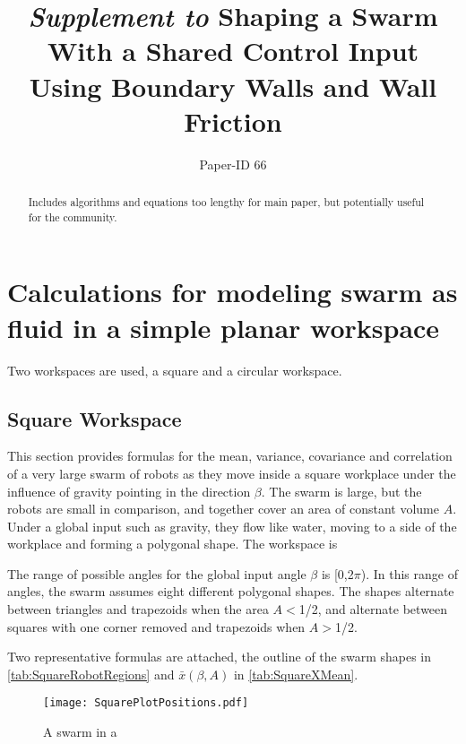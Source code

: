 \documentclass[conference]{IEEEtran}
\begin{document}
\title{\large{ \emph{Supplement to} 
Shaping a Swarm With a Shared Control Input\\ Using Boundary Walls and Wall Friction}}

\author{Paper-ID 66}


\maketitle

\begin{abstract}
Includes algorithms and equations too lengthy for main paper, but potentially useful for the community.
\end{abstract}

\IEEEpeerreviewmaketitle

\section{Calculations for modeling swarm as fluid in a simple planar workspace}
Two workspaces are used, a square and a circular workspace.

\subsection{Square Workspace}
This section provides formulas for the mean, variance,  covariance and correlation of a very large swarm of robots as they move inside a square workplace under the influence of gravity pointing in the direction $\beta$. The swarm is large, but the robots are small in comparison, and together cover an area of constant volume $A$. Under a global input such as gravity, they flow like water, moving to a side of the workplace and forming a polygonal shape. The workspace is 

The range of possible angles for the global input angle $\beta $ is [0,2$\pi $). In this range of angles, the swarm assumes eight different polygonal shapes. The shapes alternate between triangles and trapezoids when the area $A$$<$1/2, and alternate between squares with one corner removed and trapezoids when $A$$>$1/2.

Two representative formulas are attached, the outline of the swarm shapes in \eqref{tab:SquareRobotRegions} and $\bar{x}(\beta,A)$ in \eqref{tab:SquareXMean}.




\begin{figure}[h]
\begin{center}
\texttt{[image: SquarePlotPositions.pdf]} 
\caption{A swarm in a }
\label{fig:friction}
\end{center}
\end{figure} 
\end{document}
